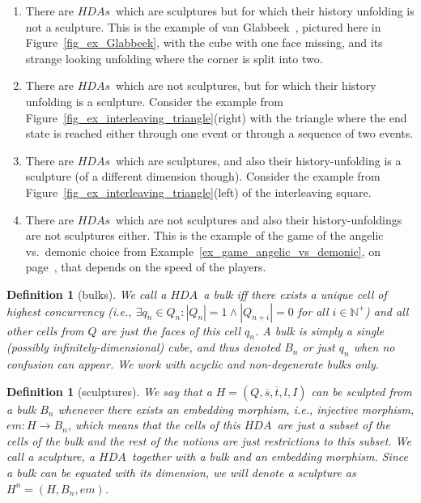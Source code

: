 \documentclass[submission,copyright,creativecommons]{eptcs}
\newtheorem{definition}[theorem]{Definition}
\newcommand\labelH{\ensuremath{l}}
\newcommand\HDA{\ensuremath{\mathit{HDA}}}
\newcommand\HDAs{\ensuremath{\mathit{HDAs}}}
\newcommand\sculpture[2]{\ensuremath{#1^{#2}}}
\newcommand\embedMorphism{\ensuremath{\mathit{em}}}
\begin{document}
\begin{enumerate}
\item There are \HDAs\ which are sculptures but for which their history unfolding is not a sculpture. This is the example of van Glabbeek~\cite[Fig.11]{Glabbeek06HDA}, pictured here in Figure~\ref{fig_ex_Glabbeek}, with the cube with one face missing, and its strange looking unfolding where the corner is split into two.

\item There are \HDAs\ which are not sculptures, but for which their history unfolding is a sculpture. 
Consider the example from Figure~\ref{fig_ex_interleaving_triangle}(right) with the triangle where the end state is reached either through one event or through a sequence of two events.

\item There are \HDAs\ which are sculptures, and also their history-unfolding is a sculpture (of a different dimension though). 
Consider the example from Figure~\ref{fig_ex_interleaving_triangle}(left) of the interleaving square.

\item There are \HDAs\ which are not sculptures and also their history-unfoldings are not sculptures either. This is the example of the game of the angelic vs.\ demonic choice from Example~\ref{ex_game_angelic_vs_demonic}, on page~\pageref{ex_game_angelic_vs_demonic}, that depends on the speed of the players.
\end{enumerate}


\begin{definition}[bulks]\label{def_bulks}
We call a \HDA\ \emph{a bulk} iff there exists a unique cell of highest concurrency (i.e., $\exists q_{n}\in Q_{n}: |Q_{n}|=1\wedge|Q_{n+i}|=0$ for all $i\in\mathbb{N}^{+}$) and all other cells from $Q$ are just the faces of this cell $q_{n}$. A bulk is simply a single (possibly infinitely-dimensional) cube, and thus denoted $B_{n}$ or just $q_{n}$ when no confusion can appear.
We work with acyclic and non-degenerate bulks only.
\end{definition}

\begin{definition}[sculptures]\label{def_sculptures}
We say that a $H=(Q,\overline{s},\overline{t},\labelH,I)$ can be \emph{sculpted} from a bulk $B_{n}$ whenever there exists an embedding morphism, i.e., injective morphism, $\embedMorphism:H\rightarrow B_{n}$, which means that the cells of this \HDA\ are just a subset of the cells of the bulk and the rest of the notions are just restrictions to this subset. 
We call a \emph{sculpture}, a \HDA\ together with a bulk and an embedding morphism. Since a bulk can be equated with its dimension, we will denote a sculpture as $\sculpture{H}{n}=(H,B_{n},\embedMorphism)$.
\end{definition}
\end{document}
